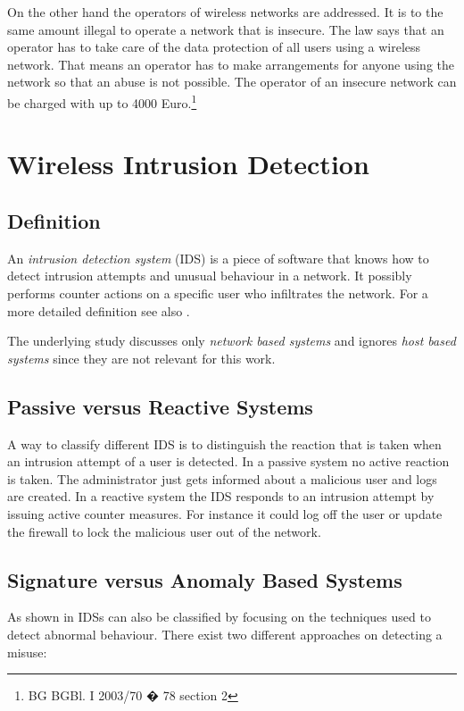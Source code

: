 On the other hand the operators of wireless networks are addressed. It is to the same amount illegal to operate a network that is insecure. The law says that an operator has to take care of the data protection of all users using a wireless network. That means an operator has to make arrangements for anyone using the network so that an abuse is not possible. The operator of an insecure network can be charged with up to 4000 Euro.\footnote{BG BGBl. I 2003/70 � 78 section 2}


\chapter{Wireless Intrusion Detection}

\section{Definition}
\label{sec:wids_definition}

An {\em intrusion detection system} (\ac{IDS}) is a piece of software that knows how to detect intrusion attempts and unusual behaviour in a network. It possibly performs counter actions on a specific user who infiltrates the network. For a more detailed definition see also \cite{idsdef}.

The underlying study discusses only {\em network based systems} and ignores {\em host based systems} since they are not relevant for this work.

\section{Passive versus Reactive Systems}

A way to classify different IDS is to distinguish the reaction that is taken when an intrusion attempt of a user is detected. In a passive system no active reaction is taken. The administrator just gets informed about a malicious user and logs are created. In a reactive system the IDS responds to an intrusion attempt by issuing active counter measures. For instance it could log off the user or update the firewall to lock the malicious user out of the network.

\section{Signature versus Anomaly Based Systems}
\label{sec:sig_anom_ids}

As shown in \cite{idsdef} IDSs can also be classified by focusing on the techniques used to detect abnormal behaviour. There exist two different approaches on detecting a misuse:

